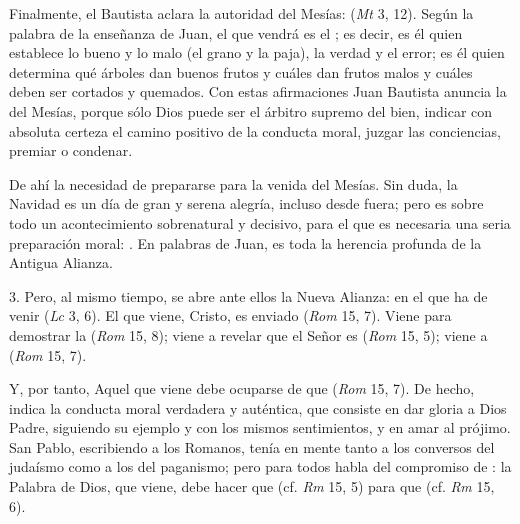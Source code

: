 \begin{body}
					Finalmente, el Bautista aclara la autoridad del Mesías:  (\emph{Mt} 3, 12). Según la palabra de la enseñanza de Juan, el que vendrá es el ; es decir, es él quien establece lo bueno y lo malo (el grano y la paja), la verdad y el error; es él quien determina qué árboles dan buenos frutos y cuáles dan frutos malos y cuáles deben ser cortados y quemados. Con estas afirmaciones Juan Bautista anuncia la  del Mesías, porque sólo Dios puede ser el árbitro supremo del bien, indicar con absoluta certeza el camino positivo de la conducta moral, juzgar las conciencias, premiar o condenar. 
					
					De ahí la necesidad de prepararse para la venida del Mesías. Sin duda, la Navidad es un día de gran y serena alegría, incluso desde fuera; pero es sobre todo un acontecimiento sobrenatural y decisivo, para el que es necesaria una seria preparación moral: . En palabras de Juan, es toda la herencia profunda de la Antigua Alianza. 
					
					3. Pero, al mismo tiempo, se abre ante ellos la Nueva Alianza: en el que ha de venir  (\emph{Lc} 3, 6). El que viene, Cristo, es enviado  (\emph{Rom} 15, 7). Viene para demostrar la  (\emph{Rom} 15, 8); viene a revelar que el Señor es  (\emph{Rom} 15, 5); viene a  (\emph{Rom} 15, 7). 
					
					Y, por tanto, Aquel que viene debe ocuparse de que  (\emph{Rom} 15, 7). De hecho, indica la conducta moral verdadera y auténtica, que consiste en dar gloria a Dios Padre, siguiendo su ejemplo y con los mismos sentimientos, y en amar al prójimo. San Pablo, escribiendo a los Romanos, tenía en mente tanto a los conversos del judaísmo como a los del paganismo; pero para todos habla del compromiso de : la Palabra de Dios, que viene, debe hacer que  (cf. \emph{Rm} 15, 5) para que  (cf. \emph{Rm} 15, 6). 
					

\end{body}

